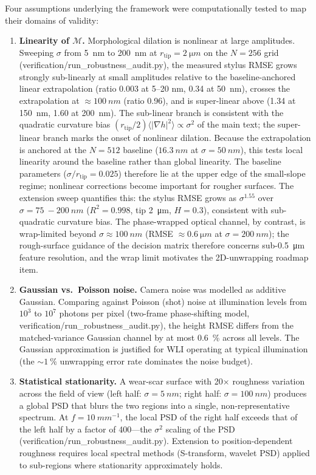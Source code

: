 \documentclass[review,12pt]{elsarticle}
\begin{document}
Four assumptions underlying the framework were computationally tested to map their domains of validity:

\begin{enumerate}
    \item \textbf{Linearity of $\mathcal{M}$.} Morphological dilation is nonlinear at large amplitudes. Sweeping $\sigma$ from \SI{5}{nm} to \SI{200}{nm} at $r_\mathrm{tip}=\SI{2}{\micro m}$ on the $N=256$ grid (verification/run\_robustness\_audit.py), the measured stylus RMSE grows strongly sub-linearly at small amplitudes relative to the baseline-anchored linear extrapolation (ratio 0.003 at 5--20 nm, 0.34 at \SI{50}{nm}), crosses the extrapolation at $\approx\SI{100}{nm}$ (ratio 0.96), and is super-linear above (1.34 at \SI{150}{nm}, 1.60 at \SI{200}{nm}). The sub-linear branch is consistent with the quadratic curvature bias $(r_\mathrm{tip}/2)\langle|\nabla h|^2\rangle \propto \sigma^2$ of the main text; the super-linear branch marks the onset of nonlinear dilation. Because the extrapolation is anchored at the $N=512$ baseline ($\SI{16.3}{nm}$ at $\sigma=\SI{50}{nm}$), this tests local linearity around the baseline rather than global linearity. The baseline parameters ($\sigma/r_\mathrm{tip}=0.025$) therefore lie at the upper edge of the small-slope regime; nonlinear corrections become important for rougher surfaces. The extension sweep quantifies this: the stylus RMSE grows as $\sigma^{1.55}$ over $\sigma=\SI{75}{-}\SI{200}{nm}$ ($R^2=0.998$, tip \SI{2}{\micro m}, $H=0.3$), consistent with sub-quadratic curvature bias. The phase-wrapped optical channel, by contrast, is wrap-limited beyond $\sigma\approx\SI{100}{nm}$ (RMSE $\approx\SI{0.6}{\micro m}$ at $\sigma=\SI{200}{nm}$); the rough-surface guidance of the decision matrix therefore concerns sub-\SI{0.5}{\micro m} feature resolution, and the wrap limit motivates the 2D-unwrapping roadmap item.

    \item \textbf{Gaussian vs.\ Poisson noise.} Camera noise was modelled as additive Gaussian. Comparing against Poisson (shot) noise at illumination levels from $10^3$ to $10^7$ photons per pixel (two-frame phase-shifting model, verification/run\_robustness\_audit.py), the height RMSE differs from the matched-variance Gaussian channel by at most \SI{0.6}{\percent} across all levels. The Gaussian approximation is justified for WLI operating at typical illumination (the $\sim\SI{1}{\percent}$ unwrapping error rate dominates the noise budget).

    \item \textbf{Statistical stationarity.} A wear-scar surface with \num{20}$\times$ roughness variation across the field of view (left half: $\sigma=\SI{5}{nm}$; right half: $\sigma=\SI{100}{nm}$) produces a global PSD that blurs the two regions into a single, non-representative spectrum. At $f=\SI{10}{mm^{-1}}$, the local PSD of the right half exceeds that of the left half by a factor of \num{400}---the $\sigma^2$ scaling of the PSD (verification/run\_robustness\_audit.py). Extension to position-dependent roughness requires local spectral methods (S-transform, wavelet PSD) applied to sub-regions where stationarity approximately holds.


\end{enumerate}
\end{document}
